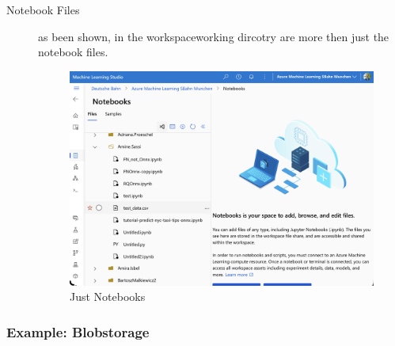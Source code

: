 \begin{description}
\begin{figure}[H]
	\end{figure}
	\item[Notebook Files] as been shown, in the workspaceworking dircotry are more then just the notebook files. 
		\begin{figure}[H]
		\centering
		\includegraphics[scale = 0.1]{attachment/chapter_10/Scc039}
		\caption{Just Notebooks}
	\end{figure}
\end{description}

\subsubsection{Example: Blobstorage}

